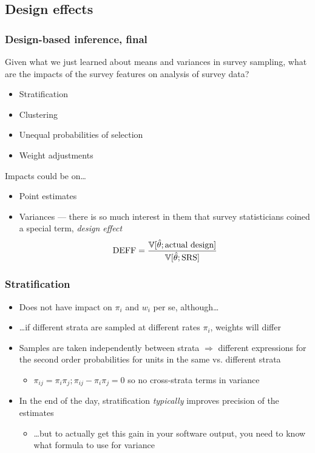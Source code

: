 \documentclass{beamer}
\newcommand{\Var}{\mathbb{V}}
\begin{document}
\subsection{Design effects}

\begin{frame}\frametitle{Design-based inference, final}

Given what we just learned about means and variances in survey sampling, what are the impacts of
the survey features on analysis of survey data?

\begin{itemize}
    \item Stratification
    \item Clustering
    \item Unequal probabilities of selection
    \item Weight adjustments
\end{itemize}

Impacts could be on\ldots
\begin{itemize}
    \item Point estimates
    \item Variances --- there is so much interest in them that survey statisticians coined a special term,
        \textit{design effect}
        $$
            {\rm DEFF} = \frac{\Var[\hat\theta; \mbox{actual design}]}{\Var[\hat\theta; \mbox{SRS}]}
        $$
\end{itemize}

\end{frame}

\begin{frame}\frametitle{Stratification}

\begin{itemize}
    \item Does not have impact on $\pi_i$ and $w_i$ per se, although\ldots
    \item \ldots if different strata are sampled at different rates $\pi_i$, weights will differ
    \item Samples are taken independently between strata $\Rightarrow$ different
        expressions for the second order probabilities for units in the same vs. different strata
        \begin{itemize}
            \item $\pi_{ij} = \pi_i \pi_j; \pi_{ij} - \pi_i \pi_j=0$ 
                  so no cross-strata terms in variance
        \end{itemize}
    \item In the end of the day, stratification \textit{typically} improves precision of the estimates
        \begin{itemize}
            \item \ldots but to actually get this gain in your software output,
                you need to know what formula to use for variance
        \end{itemize}
\end{itemize}

\end{frame}
\end{document}
